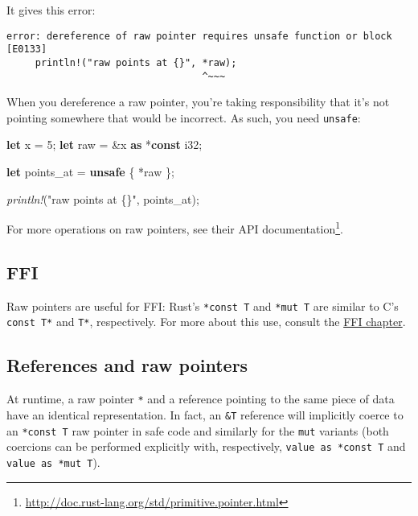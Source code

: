 \documentclass[a4paper,]{book}
\newenvironment{Shaded}{\begin{snugshade}}{\end{snugshade}}
\newcommand{\KeywordTok}[1]{\textcolor[rgb]{0.13,0.29,0.53}{\textbf{{#1}}}}
\newcommand{\DataTypeTok}[1]{\textcolor[rgb]{0.13,0.29,0.53}{{#1}}}
\newcommand{\DecValTok}[1]{\textcolor[rgb]{0.00,0.00,0.81}{{#1}}}
\newcommand{\StringTok}[1]{\textcolor[rgb]{0.31,0.60,0.02}{{#1}}}
\newcommand{\PreprocessorTok}[1]{\textcolor[rgb]{0.56,0.35,0.01}{\textit{{#1}}}}
\newcommand{\NormalTok}[1]{{#1}}
\renewcommand{\href}[2]{#2\footnote{\url{#1}}}
\begin{document}
It gives this error:

\begin{verbatim}
error: dereference of raw pointer requires unsafe function or block [E0133]
     println!("raw points at {}", *raw);
                                  ^~~~
\end{verbatim}

When you dereference a raw pointer, you're taking responsibility that
it's not pointing somewhere that would be incorrect. As such, you need
\texttt{unsafe}:

\begin{Shaded}
\begin{Highlighting}[]
\KeywordTok{let} \NormalTok{x = }\DecValTok{5}\NormalTok{;}
\KeywordTok{let} \NormalTok{raw = &x }\KeywordTok{as} \NormalTok{*}\KeywordTok{const} \DataTypeTok{i32}\NormalTok{;}

\KeywordTok{let} \NormalTok{points_at = }\KeywordTok{unsafe} \NormalTok{\{ *raw \};}

\PreprocessorTok{println!}\NormalTok{(}\StringTok{"raw points at \{\}"}\NormalTok{, points_at);}
\end{Highlighting}
\end{Shaded}

For more operations on raw pointers, see
\href{http://doc.rust-lang.org/std/primitive.pointer.html}{their API
documentation}.

\subsection{FFI}\label{ffi}

Raw pointers are useful for FFI: Rust's \texttt{*const\ T} and
\texttt{*mut\ T} are similar to C's \texttt{const\ T*} and \texttt{T*},
respectively. For more about this use, consult the
\protect\hyperlink{sec--ffi}{FFI chapter}.

\subsection{References and raw
pointers}\label{references-and-raw-pointers}

At runtime, a raw pointer \texttt{*} and a reference pointing to the
same piece of data have an identical representation. In fact, an
\texttt{\&T} reference will implicitly coerce to an \texttt{*const\ T}
raw pointer in safe code and similarly for the \texttt{mut} variants
(both coercions can be performed explicitly with, respectively,
\texttt{value\ as\ *const\ T} and \texttt{value\ as\ *mut\ T}).
\end{document}
